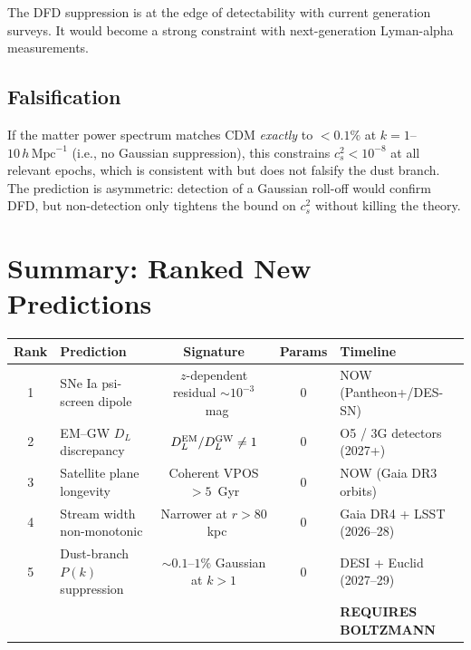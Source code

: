 \documentclass[11pt]{article}
\begin{document}
The DFD suppression is at the edge of detectability with current
generation surveys.  It would become a strong constraint with
next-generation Lyman-alpha measurements.

\subsection{Falsification}

If the matter power spectrum matches CDM \emph{exactly} to $< 0.1\%$ at
$k = 1$--$10\,h\,\text{Mpc}^{-1}$ (i.e., no Gaussian suppression),
this constrains $c_s^2 < 10^{-8}$ at all relevant epochs, which is
consistent with but does not falsify the dust branch.  The prediction
is asymmetric: detection of a Gaussian roll-off would confirm DFD,
but non-detection only tightens the bound on $c_s^2$ without killing
the theory.

\section{Summary: Ranked New Predictions}
\label{sec:summary}

\begin{center}
\small
\begin{tabular}{clccl}
\toprule
\textbf{Rank} & \textbf{Prediction} & \textbf{Signature} & \textbf{Params}
& \textbf{Timeline} \\
\midrule
1 & SNe Ia psi-screen dipole & $z$-dependent residual $\sim 10^{-3}$~mag
  & 0 & NOW (Pantheon+/DES-SN) \\
2 & EM--GW $D_L$ discrepancy & $D_L^{\rm EM}/D_L^{\rm GW} \neq 1$
  & 0 & O5 / 3G detectors (2027+) \\
3 & Satellite plane longevity & Coherent VPOS $> 5$~Gyr
  & 0 & NOW (Gaia DR3 orbits) \\
4 & Stream width non-monotonic & Narrower at $r > 80$~kpc
  & 0 & Gaia DR4 + LSST (2026--28) \\
5 & Dust-branch $P(k)$ suppression & $\sim 0.1$--$1\%$ Gaussian at $k > 1$
  & 0 & DESI + Euclid (2027--29) \\
  & & & & \textbf{REQUIRES BOLTZMANN} \\
\bottomrule
\end{tabular}
\end{center}

\end{document}
